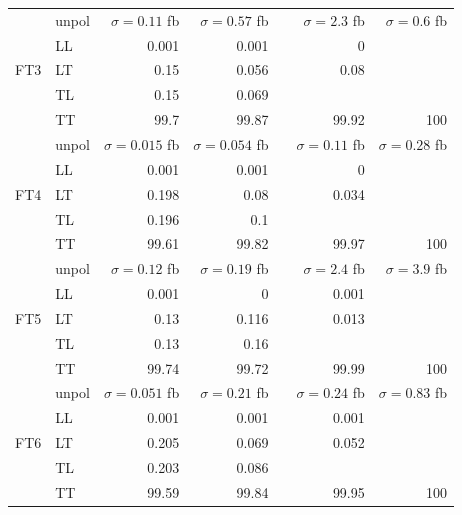 \begin{table}[h]
{\begin{tabular}{llrrrrr}
\midrule
\multirow{5}{*}{FT3}
 & unpol & $\sigma = \num{0.11}$ fb & $\sigma = \num{0.57}$ fb &  & $\sigma = \num{2.3}$ fb & $\sigma = \num{0.6}$ fb \\
 & LL & \num{0.001} & \num{0.001} &  & \num{0} &  \\
 & LT & \num{0.15} & \num{0.056} &  & \num{0.08} &  \\
 & TL & \num{0.15} & \num{0.069} &  &  &  \\
 & TT & \num{99.7} & \num{99.87} &  & \num{99.92} & \num{100} \\
\midrule
\multirow{5}{*}{FT4}
 & unpol & $\sigma = \num{0.015}$ fb & $\sigma = \num{0.054}$ fb &  & $\sigma = \num{0.11}$ fb & $\sigma = \num{0.28}$ fb \\
 & LL & \num{0.001} & \num{0.001} &  & \num{0} &  \\
 & LT & \num{0.198} & \num{0.08} &  & \num{0.034} &  \\
 & TL & \num{0.196} & \num{0.1} &  &  &  \\
 & TT & \num{99.61} & \num{99.82} &  & \num{99.97} & \num{100} \\
\midrule
\multirow{5}{*}{FT5}
 & unpol & $\sigma = \num{0.12}$ fb & $\sigma = \num{0.19}$ fb &  & $\sigma = \num{2.4}$ fb & $\sigma = \num{3.9}$ fb \\
 & LL & \num{0.001} & \num{0} &  & \num{0.001} &  \\
 & LT & \num{0.13} & \num{0.116} &  & \num{0.013} &  \\
 & TL & \num{0.13} & \num{0.16} &  &  &  \\
 & TT & \num{99.74} & \num{99.72} &  & \num{99.99} & \num{100} \\
\midrule
\multirow{5}{*}{FT6}
 & unpol & $\sigma = \num{0.051}$ fb & $\sigma = \num{0.21}$ fb &  & $\sigma = \num{0.24}$ fb & $\sigma = \num{0.83}$ fb \\
 & LL & \num{0.001} & \num{0.001} &  & \num{0.001} &  \\
 & LT & \num{0.205} & \num{0.069} &  & \num{0.052} &  \\
 & TL & \num{0.203} & \num{0.086} &  &  &  \\
 & TT & \num{99.59} & \num{99.84} &  & \num{99.95} & \num{100} \\
\bottomrule
\end{tabular}
}%
\end{table}